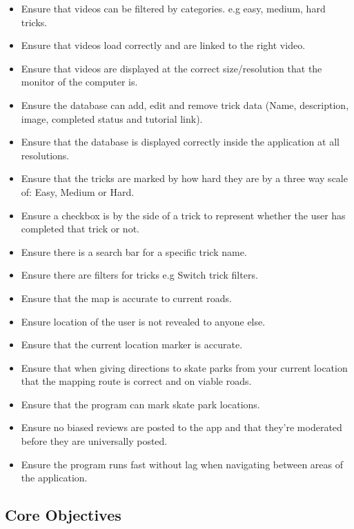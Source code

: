 \begin{itemize}
\item Ensure that videos can be filtered by categories. e.g easy, medium, hard tricks.
\item Ensure that videos load correctly and are linked to the right video.
\item Ensure that videos are displayed at the correct size/resolution that the monitor of the computer is.



\item Ensure the database can add, edit and remove trick data (Name, description, image, completed status and tutorial link).
\item Ensure that the database is displayed correctly inside the application at all resolutions.
\item Ensure that the tricks are marked by how hard they are by a three way scale of: Easy, Medium or Hard.
\item Ensure a checkbox is by the side of a trick to represent whether the user has completed that trick or not.
\item Ensure there is a search bar for a specific trick name.
\item Ensure there are filters for tricks e.g Switch trick filters.



\item Ensure that the map is accurate to current roads.
\item Ensure location of the user is not revealed to anyone else.
\item Ensure that the current location marker is accurate.
\item Ensure that when giving directions to skate parks from your current location that the mapping route is correct and on viable roads. 
\item Ensure that the program can mark skate park locations.




\item Ensure no biased reviews are posted to the app and that they're moderated before they are universally posted.
\item Ensure the program runs fast without lag when navigating between areas of the application.
\end{itemize}

\subsection{Core Objectives}

